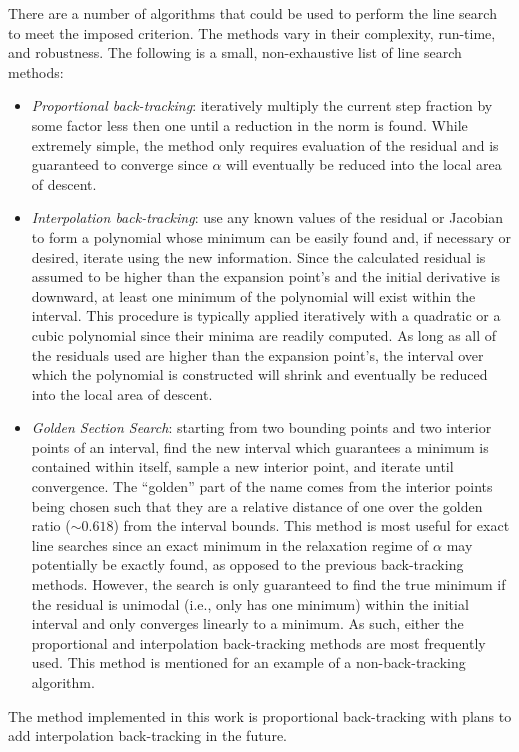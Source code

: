 \documentclass[12pt]{UWMadThesis}
\begin{document}
There are a number of algorithms that could be used to perform the line search to meet the imposed criterion.
The methods vary in their complexity, run-time, and robustness.
The following is a small, non-exhaustive list of line search methods:
\begin{itemize}
	\item{\textit{Proportional back-tracking}: 
        iteratively multiply the current step fraction by some factor less then one until a reduction in the norm is found.
        While extremely simple, the method only requires evaluation of the residual and is guaranteed to converge since $\alpha$ will eventually be reduced into the local area of descent.
    }
    \item{\textit{Interpolation back-tracking}:
        use any known values of the residual or Jacobian to form a polynomial whose minimum can be easily found and, if necessary or desired, iterate using the new information.
        Since the calculated residual is assumed to be higher than the expansion point's and the initial derivative is downward, at least one minimum of the polynomial will exist within the interval.
        This procedure is typically applied iteratively with a quadratic or a cubic polynomial since their minima are readily computed.
        As long as all of the residuals used are higher than the expansion point's, the interval over which the polynomial is constructed will shrink and eventually be reduced into the local area of descent.
    }
    \item{\textit{Golden Section Search}:
        starting from two bounding points and two interior points of an interval, find the new interval which guarantees a minimum is contained within itself, sample a new interior point, and iterate until convergence.
        The ``golden'' part of the name comes from the interior points being chosen such that they are a relative distance of one over the golden ratio ($\sim0.618$) from the interval bounds.
        This method is most useful for exact line searches since an exact minimum in the relaxation regime of $\alpha$ may potentially be exactly found, as opposed to the previous back-tracking methods.
        However, the search is only guaranteed to find the true minimum if the residual is unimodal (i.e., only has one minimum) within the initial interval and only converges linearly to a minimum.
        As such, either the proportional and interpolation back-tracking methods are most frequently used.
        This method is mentioned for an example of a non-back-tracking algorithm.
    }
\end{itemize}
The method implemented in this work is proportional back-tracking with plans to add interpolation back-tracking in the future.
\end{document}
